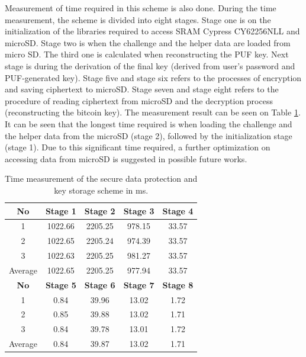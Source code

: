Measurement of time required in this scheme is also done. During the time measurement, the scheme is divided into eight stages. Stage one is on the initialization of the libraries required to access SRAM Cypress CY62256NLL and microSD. Stage two is when the challenge and the helper data are loaded from micro SD. The third one is calculated when reconstructing the PUF key. Next stage is during the derivation of the final key (derived from user's password and PUF-generated key). Stage five and stage six refers to the processes of encryption and saving ciphertext to microSD. Stage seven and stage eight refers to the procedure of reading ciphertext from microSD and the decryption process (reconstructing the bitcoin key). The measurement result can be seen on Table \ref{tab:time_scheme}. It can be seen that the longest time required is when loading the challenge and the helper data from the microSD (stage 2), followed by the initialization stage (stage 1). Due to this significant time required, a further optimization on accessing data from microSD is suggested in possible future works.

\begin{table}[htbp]
  \centering
  \caption{Time measurement of the secure data protection and key storage scheme in ms.}
    \begin{tabular}{|c|c|c|c|c|}
    \hline
    \textbf{No} & \textbf{Stage 1} & \textbf{Stage 2} & \textbf{Stage 3} & \textbf{Stage 4} \\
    \hline
    1     & 1022.66 & 2205.25 & 978.15 & 33.57 \\
    \hline
    2     & 1022.65 & 2205.24 & 974.39 & 33.57 \\
    \hline
    3     & 1022.63 & 2205.25 & 981.27 & 33.57 \\
    \hline
    Average & 1022.65 & 2205.25 & 977.94 & 33.57 \\
    \hline
    \textbf{No} & \textbf{Stage 5} & \textbf{Stage 6} & \textbf{Stage 7} & \textbf{Stage 8} \\
    \hline
    1     & 0.84  & 39.96 & 13.02 & 1.72 \\
    \hline
    2     & 0.85  & 39.88 & 13.02 & 1.71 \\
    \hline
    3     & 0.84  & 39.78 & 13.01 & 1.72 \\
    \hline
    Average & 0.84  & 39.87 & 13.02 & 1.71 \\
    \hline
    \end{tabular}%
  \label{tab:time_scheme}%
\end{table}%

